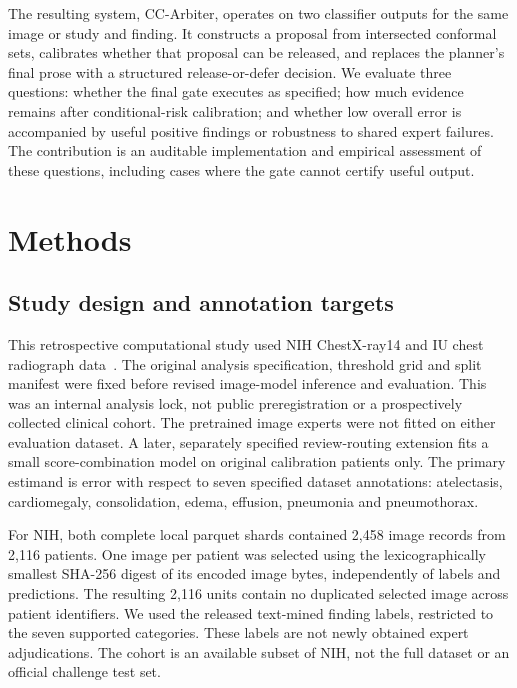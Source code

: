 \documentclass[10pt,a4paper]{article}
\begin{document}
The resulting system, CC-Arbiter, operates on two classifier outputs for the same image or study and finding. It constructs a proposal from intersected conformal sets, calibrates whether that proposal can be released, and replaces the planner's final prose with a structured release-or-defer decision. We evaluate three questions: whether the final gate executes as specified; how much evidence remains after conditional-risk calibration; and whether low overall error is accompanied by useful positive findings or robustness to shared expert failures. The contribution is an auditable implementation and empirical assessment of these questions, including cases where the gate cannot certify useful output.

\section{Methods}
\subsection{Study design and annotation targets}
This retrospective computational study used NIH ChestX-ray14 and IU chest radiograph data~\cite{nih,iu}. The original analysis specification, threshold grid and split manifest were fixed before revised image-model inference and evaluation. This was an internal analysis lock, not public preregistration or a prospectively collected clinical cohort. The pretrained image experts were not fitted on either evaluation dataset. A later, separately specified review-routing extension fits a small score-combination model on original calibration patients only. The primary estimand is error with respect to seven specified dataset annotations: atelectasis, cardiomegaly, consolidation, edema, effusion, pneumonia and pneumothorax.

For NIH, both complete local parquet shards contained 2,458 image records from 2,116 patients. One image per patient was selected using the lexicographically smallest SHA-256 digest of its encoded image bytes, independently of labels and predictions. The resulting 2,116 units contain no duplicated selected image across patient identifiers. We used the released text-mined finding labels, restricted to the seven supported categories. These labels are not newly obtained expert adjudications. The cohort is an available subset of NIH, not the full dataset or an official challenge test set.
\end{document}
